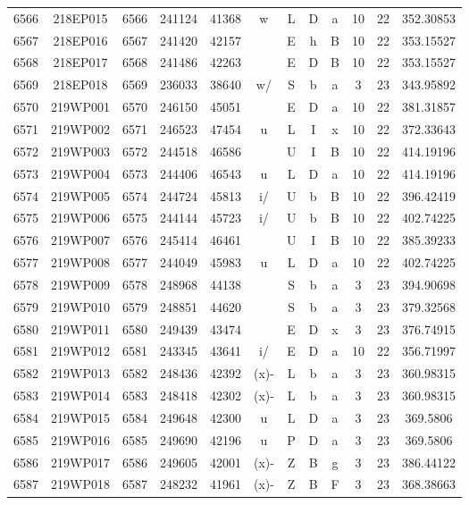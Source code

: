 \begin{tabular}{|*{12}{c|}}
6566 & 218EP015 & 6566 & 241124 & 41368 & w & L & D & a & 10 & 22 & 352.30853 \\ 
6567 & 218EP016 & 6567 & 241420 & 42157 &  & E & h & B & 10 & 22 & 353.15527 \\ 
6568 & 218EP017 & 6568 & 241486 & 42263 &  & E & D & B & 10 & 22 & 353.15527 \\ 
6569 & 218EP018 & 6569 & 236033 & 38640 & w/ & S & b & a & 3 & 23 & 343.95892 \\ 
6570 & 219WP001 & 6570 & 246150 & 45051 &  & E & D & a & 10 & 22 & 381.31857 \\ 
6571 & 219WP002 & 6571 & 246523 & 47454 & u & L & I & x & 10 & 22 & 372.33643 \\ 
6572 & 219WP003 & 6572 & 244518 & 46586 &  & U & I & B & 10 & 22 & 414.19196 \\ 
6573 & 219WP004 & 6573 & 244406 & 46543 & u & L & D & a & 10 & 22 & 414.19196 \\ 
6574 & 219WP005 & 6574 & 244724 & 45813 & i/ & U & b & B & 10 & 22 & 396.42419 \\ 
6575 & 219WP006 & 6575 & 244144 & 45723 & i/ & U & b & B & 10 & 22 & 402.74225 \\ 
6576 & 219WP007 & 6576 & 245414 & 46461 &  & U & I & B & 10 & 22 & 385.39233 \\ 
6577 & 219WP008 & 6577 & 244049 & 45983 & u & L & D & a & 10 & 22 & 402.74225 \\ 
6578 & 219WP009 & 6578 & 248968 & 44138 &  & S & b & a & 3 & 23 & 394.90698 \\ 
6579 & 219WP010 & 6579 & 248851 & 44620 &  & S & b & a & 3 & 23 & 379.32568 \\ 
6580 & 219WP011 & 6580 & 249439 & 43474 &  & E & D & x & 3 & 23 & 376.74915 \\ 
6581 & 219WP012 & 6581 & 243345 & 43641 & i/ & E & D & a & 10 & 22 & 356.71997 \\ 
6582 & 219WP013 & 6582 & 248436 & 42392 & (x)- & L & b & a & 3 & 23 & 360.98315 \\ 
6583 & 219WP014 & 6583 & 248418 & 42302 & (x)- & L & b & a & 3 & 23 & 360.98315 \\ 
6584 & 219WP015 & 6584 & 249648 & 42300 & u & L & D & a & 3 & 23 & 369.5806 \\ 
6585 & 219WP016 & 6585 & 249690 & 42196 & u & P & D & a & 3 & 23 & 369.5806 \\ 
6586 & 219WP017 & 6586 & 249605 & 42001 & (x)- & Z & B & g & 3 & 23 & 386.44122 \\ 
6587 & 219WP018 & 6587 & 248232 & 41961 & (x)- & Z & B & F & 3 & 23 & 368.38663 \\ 

\end{tabular}
